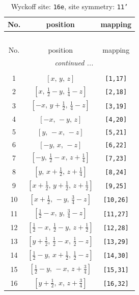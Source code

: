 \documentclass[fleqn,8pt]{jsarticle}
\begin{document}
\begin{longtable}{ccc}
\caption{Wyckoff site: {\tt 16e}, site symmetry: {\tt 11'}}
 \\
 \hline \hline
No. & position & mapping \\ \hline \endfirsthead

\multicolumn{2}{l}{\tablename\ \thetable{}} \\
 \hline \hline
No. & position & mapping \\ \hline \endhead

 \hline \hline
\multicolumn{2}{r}{\footnotesize\it continued ...} \\ \endfoot

 \hline \hline
\multicolumn{2}{r}{} \\ \endlastfoot

1 & $\left[ x,\, y,\, z \right]$ & {\tt [1,17]} \\ \hline
2 & $\left[ x,\, \frac{1}{2} - y,\, \frac{1}{4} - z \right]$ & {\tt [2,18]} \\ \hline
3 & $\left[ - x,\, y + \frac{1}{2},\, \frac{1}{4} - z \right]$ & {\tt [3,19]} \\ \hline
4 & $\left[ - x,\, - y,\, z \right]$ & {\tt [4,20]} \\ \hline
5 & $\left[ y,\, - x,\, - z \right]$ & {\tt [5,21]} \\ \hline
6 & $\left[ - y,\, x,\, - z \right]$ & {\tt [6,22]} \\ \hline
7 & $\left[ - y,\, \frac{1}{2} - x,\, z + \frac{1}{4} \right]$ & {\tt [7,23]} \\ \hline
8 & $\left[ y,\, x + \frac{1}{2},\, z + \frac{1}{4} \right]$ & {\tt [8,24]} \\ \hline
9 & $\left[ x + \frac{1}{2},\, y + \frac{1}{2},\, z + \frac{1}{2} \right]$ & {\tt [9,25]} \\ \hline
10 & $\left[ x + \frac{1}{2},\, - y,\, \frac{3}{4} - z \right]$ & {\tt [10,26]} \\ \hline
11 & $\left[ \frac{1}{2} - x,\, y,\, \frac{3}{4} - z \right]$ & {\tt [11,27]} \\ \hline
12 & $\left[ \frac{1}{2} - x,\, \frac{1}{2} - y,\, z + \frac{1}{2} \right]$ & {\tt [12,28]} \\ \hline
13 & $\left[ y + \frac{1}{2},\, \frac{1}{2} - x,\, \frac{1}{2} - z \right]$ & {\tt [13,29]} \\ \hline
14 & $\left[ \frac{1}{2} - y,\, x + \frac{1}{2},\, \frac{1}{2} - z \right]$ & {\tt [14,30]} \\ \hline
15 & $\left[ \frac{1}{2} - y,\, - x,\, z + \frac{3}{4} \right]$ & {\tt [15,31]} \\ \hline
16 & $\left[ y + \frac{1}{2},\, x,\, z + \frac{3}{4} \right]$ & {\tt [16,32]} \\
\end{longtable}
\end{document}
